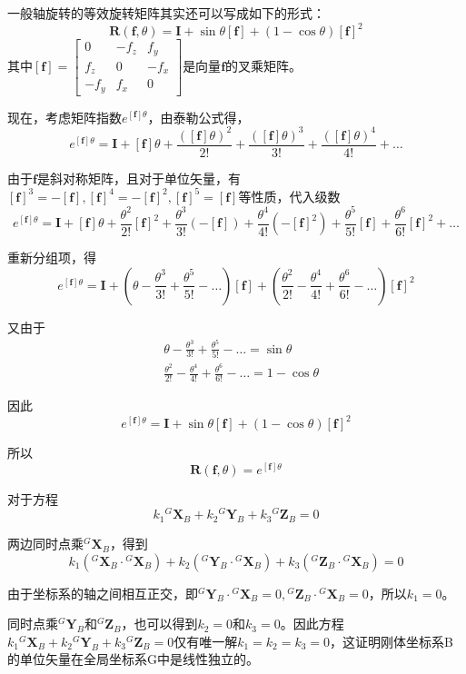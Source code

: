 \documentclass{homework}
\begin{document}
\begin{sol}
  一般轴旋转的等效旋转矩阵其实还可以写成如下的形式：
  \[ 
    \mathbf{R}(\mathbf{f}, \theta) = \mathbf{I} + \sin\theta [\mathbf{f}] + (1 - \cos\theta) [\mathbf{f}]^2
  \]
  其中$ [\mathbf{f}] = 
  \begin{bmatrix}
    0 & -f_z & f_y \\
    f_z & 0 & -f_x \\
    -f_y & f_x & 0
  \end{bmatrix} $是向量$ \mathbf{f} $的叉乘矩阵。

  现在，考虑矩阵指数$ e^{[\mathbf{f}]\theta} $，由泰勒公式得，
  \[ 
    e^{[\mathbf{f}]\theta} = \mathbf{I} + [\mathbf{f}]\theta + \frac{([\mathbf{f}]\theta)^2}{2!} + \frac{([\mathbf{f}]\theta)^3}{3!} + \frac{([\mathbf{f}]\theta)^4}{4!} + \dots
  \]

  由于$ \mathbf{f} $是斜对称矩阵，且对于单位矢量，有$ [\mathbf{f}]^3 = -[\mathbf{f}], [\mathbf{f}]^4 = -[\mathbf{f}]^2, [\mathbf{f}]^5 = [\mathbf{f}] $等性质，代入级数
  \[ 
    e^{[\mathbf{f}]\theta} = \mathbf{I} + [\mathbf{f}]\theta + \frac{\theta^2}{2!} [\mathbf{f}]^2 + \frac{\theta^3}{3!}(-[\mathbf{f}]) + \frac{\theta^4}{4!}(-[\mathbf{f}]^2) + \frac{\theta^5}{5!}[\mathbf{f}] + \frac{\theta^6}{6!}[\mathbf{f}]^2 + \dots
  \]

  重新分组项，得
  \[ 
    e^{[\mathbf{f}]\theta} = \mathbf{I} + (\theta - \frac{\theta^3}{3!} + \frac{\theta^5}{5!} - \dots)[\mathbf{f}] + (\frac{\theta^2}{2!} - \frac{\theta^4}{4!} + \frac{\theta^6}{6!} - \dots)[\mathbf{f}]^2
  \]

  又由于
  \begin{align*}
    & \theta - \frac{\theta^3}{3!} + \frac{\theta^5}{5!} - \dots = \sin\theta \\
    & \frac{\theta^2}{2!} - \frac{\theta^4}{4!} + \frac{\theta^6}{6!} - \dots = 1 - \cos\theta
  \end{align*}

  因此
  \[ 
    e^{[\mathbf{f}]\theta} = \mathbf{I} + \sin\theta[\mathbf{f}] + (1 - \cos\theta)[\mathbf{f}]^2
  \]

  所以
  \[ 
    \mathbf{R}(\mathbf{f}, \theta) = e^{[\mathbf{f}]\theta} 
  \]
\end{sol}

\question 

\begin{sol}
  对于方程
  \[
    k_1 {^G}\mathbf{X}_B + k_2 {^G}\mathbf{Y}_B + k_3 {^G}\mathbf{Z}_B = 0
  \]

  两边同时点乘$ {^G}\mathbf{X}_B $，得到
  \[
    k_1({^G}\mathbf{X}_B \cdot {^G}\mathbf{X}_B) + k_2({^G}\mathbf{Y}_B \cdot {^G}\mathbf{X}_B) + k_3({^G}\mathbf{Z}_B \cdot {^G}\mathbf{X}_B) = 0
  \]

  由于坐标系的轴之间相互正交，即$ {^G}\mathbf{Y}_B \cdot {^G}\mathbf{X}_B = 0, {^G}\mathbf{Z}_B \cdot {^G}\mathbf{X}_B = 0 $，所以$ k_1 = 0 $。

  同时点乘$ {^G}\mathbf{Y}_B $和$ {^G}\mathbf{Z}_B $，也可以得到$ k_2 = 0 $和$ k_3 = 0 $。因此方程$ k_1 {^G}\mathbf{X}_B + k_2 {^G}\mathbf{Y}_B + k_3 {^G}\mathbf{Z}_B = 0 $仅有唯一解$ k_1 = k_2 = k_3 = 0 $，这证明刚体坐标系B的单位矢量在全局坐标系G中是线性独立的。
  
\end{sol}
\end{document}
